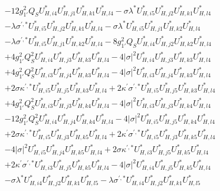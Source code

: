 \begin{align}
 &-12 g_{1'}^{2} Q_{S} U^*_{{H},{i 4}} U^*_{{H},{j 1}} U^*_{{H},{k 1}} U^*_{{H},{l 4}} - \sigma \lambda^* U^*_{{H},{i 5}} U^*_{{H},{j 2}} U^*_{{H},{k 1}} U^*_{{H},{l 4}} \nonumber \\ 
 &- \lambda \sigma^{\prime,*} U^*_{{H},{i 5}} U^*_{{H},{j 2}} U^*_{{H},{k 1}} U^*_{{H},{l 4}} - \sigma \lambda^* U^*_{{H},{i 5}} U^*_{{H},{j 1}} U^*_{{H},{k 2}} U^*_{{H},{l 4}} \nonumber \\ 
 &- \lambda \sigma^{\prime,*} U^*_{{H},{i 5}} U^*_{{H},{j 1}} U^*_{{H},{k 2}} U^*_{{H},{l 4}} -8 g_{1'}^{2} Q_{S} U^*_{{H},{i 4}} U^*_{{H},{j 2}} U^*_{{H},{k 2}} U^*_{{H},{l 4}} \nonumber \\ 
 &+4 g_{1'}^{2} Q_{S}^{2} U^*_{{H},{i 4}} U^*_{{H},{j 3}} U^*_{{H},{k 3}} U^*_{{H},{l 4}} -4 |\sigma|^2 U^*_{{H},{i 4}} U^*_{{H},{j 3}} U^*_{{H},{k 3}} U^*_{{H},{l 4}} \nonumber \\ 
 &+4 g_{1'}^{2} Q_{S}^{2} U^*_{{H},{i 3}} U^*_{{H},{j 4}} U^*_{{H},{k 3}} U^*_{{H},{l 4}} -4 |\sigma|^2 U^*_{{H},{i 3}} U^*_{{H},{j 4}} U^*_{{H},{k 3}} U^*_{{H},{l 4}} \nonumber \\ 
 &+2 \sigma \kappa^{\prime,*} U^*_{{H},{i 5}} U^*_{{H},{j 5}} U^*_{{H},{k 3}} U^*_{{H},{l 4}} +2 \kappa^\prime \sigma^{\prime,*} U^*_{{H},{i 5}} U^*_{{H},{j 5}} U^*_{{H},{k 3}} U^*_{{H},{l 4}} \nonumber \\ 
 &+4 g_{1'}^{2} Q_{S}^{2} U^*_{{H},{i 3}} U^*_{{H},{j 3}} U^*_{{H},{k 4}} U^*_{{H},{l 4}} -4 |\sigma|^2 U^*_{{H},{i 3}} U^*_{{H},{j 3}} U^*_{{H},{k 4}} U^*_{{H},{l 4}} \nonumber \\ 
 &-12 g_{1'}^{2} Q_{S}^{2} U^*_{{H},{i 4}} U^*_{{H},{j 4}} U^*_{{H},{k 4}} U^*_{{H},{l 4}} -4 |\sigma|^2 U^*_{{H},{i 5}} U^*_{{H},{j 5}} U^*_{{H},{k 4}} U^*_{{H},{l 4}} \nonumber \\ 
 &+2 \sigma \kappa^{\prime,*} U^*_{{H},{i 5}} U^*_{{H},{j 3}} U^*_{{H},{k 5}} U^*_{{H},{l 4}} +2 \kappa^\prime \sigma^{\prime,*} U^*_{{H},{i 5}} U^*_{{H},{j 3}} U^*_{{H},{k 5}} U^*_{{H},{l 4}} \nonumber \\ 
 &-4 |\sigma|^2 U^*_{{H},{i 5}} U^*_{{H},{j 4}} U^*_{{H},{k 5}} U^*_{{H},{l 4}} +2 \sigma \kappa^{\prime,*} U^*_{{H},{i 3}} U^*_{{H},{j 5}} U^*_{{H},{k 5}} U^*_{{H},{l 4}} \nonumber \\ 
 &+2 \kappa^\prime \sigma^{\prime,*} U^*_{{H},{i 3}} U^*_{{H},{j 5}} U^*_{{H},{k 5}} U^*_{{H},{l 4}} -4 |\sigma|^2 U^*_{{H},{i 4}} U^*_{{H},{j 5}} U^*_{{H},{k 5}} U^*_{{H},{l 4}} \nonumber \\ 
 &- \sigma \lambda^* U^*_{{H},{i 4}} U^*_{{H},{j 2}} U^*_{{H},{k 1}} U^*_{{H},{l 5}} - \lambda \sigma^{\prime,*} U^*_{{H},{i 4}} U^*_{{H},{j 2}} U^*_{{H},{k 1}} U^*_{{H},{l 5}} \nonumber \\ 

\end{align}
